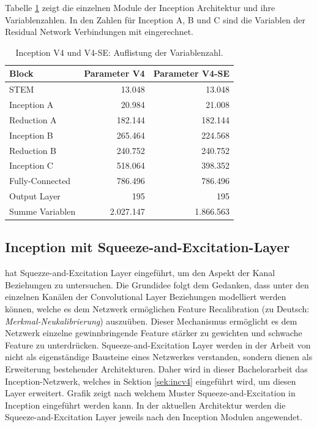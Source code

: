 Tabelle \ref{tb:var_inc4} zeigt die einzelnen Module der Inception Architektur und ihre Variablenzahlen. In den Zahlen f\"ur Inception A, B und C sind die Variablen der Residual Network Verbindungen mit eingerechnet. 

\begin{table}
\centering
\caption{Inception V4 und V4-SE: Auflistung der Variablenzahl.}
\begin{tabular}{@{}lrr@{}}
\hline
Block & Parameter V4 & Parameter V4-SE\\
\hline
STEM &  13.048 & 13.048\\
Inception A & 20.984 & 21.008\\
Reduction A & 182.144 & 182.144\\
Inception B & 265.464 & 224.568\\
Reduction B & 240.752 & 240.752\\
Inception C & 518.064 & 398.352\\
Fully-Connected & 786.496 & 786.496\\
Output Layer & 195 & 195\\
\hline
Summe Variablen & 2.027.147 & 1.866.563\\
\hline
\end{tabular}
\label{tb:var_inc4}
\end{table}

\subsection{Inception mit Squeeze-and-Excitation-Layer}

\textcite{DBLP:journals/corr/abs-1709-01507} hat Squezze-and-Excitation Layer eingeführt, um den Aspekt der Kanal Beziehungen zu untersuchen. Die Grundidee folgt dem Gedanken, dass unter den einzelnen Kanälen der Convolutional Layer Beziehungen modelliert werden können, welche es dem Netzwerk ermöglichen Feature Recalibration (zu Deutsch: \textit{Merkmal-Neukalibrierung}) auszuüben. Dieser Mechanismus ermöglicht es dem Netzwerk einzelne gewinnbringende Feature stärker zu gewichten und schwache Feature zu unterdrücken. Squeeze-and-Excitation Layer werden in der Arbeit von \textcite{DBLP:journals/corr/abs-1709-01507} nicht als eigenständige Bausteine eines Netzwerkes verstanden, sondern dienen als Erweiterung bestehender Architekturen. Daher wird in dieser Bachelorarbeit das Inception-Netzwerk, welches in Sektion \ref{sek:incv4} eingeführt wird, um diesen Layer erweitert. Grafik zeigt nach welchem Muster Squeeze-and-Excitation in Inception eingeführt werden kann. In der aktuellen Architektur werden die Squeeze-and-Excitation Layer jeweils nach den Inception Modulen angewendet. 

